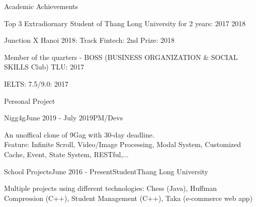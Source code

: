 \documentclass{resume} %
\begin{document}

\begin{rSection}{Academic Achievements} \itemsep -2pt
\item Top 3 Extradiornary Student of Thang Long University for 2 years: 2017 2018 
\item Junction X Hanoi 2018: Track Fintech: 2nd Prize: 2018
\item Member of the quarters - BOSS (BUSINESS ORGANIZATION \& SOCIAL SKILLS Club) TLU: 2017
\item IELTS: 7.5/9.0: 2017
\end{rSection}

\begin{rSection}{Personal Project}

\begin{rSubsection}{Nigg4g}{June 2019 - July 2019}{PM/Devs}
\item An unoffical clone of 9Gag with 30-day deadline.
\\Feature: Infinite Scroll, Video/Image Processing, Modal System, Customized Cache, Event, State System, RESTful,...
\end{rSubsection}

\begin{rSubsection}{School Projects}{June 2016 - Present}{Student}{Thang Long University}
\item Multiple projects using different technologies: Chess (Java), Huffman Compression (C++), Student Management (C++), Taka (e-commerce web app)
\end{rSubsection}
\end{rSection}
\end{document}
